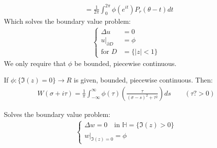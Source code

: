 \begin{proposition}
\begin{align}
                        & = \frac{1}{2\pi}\int_{0}^{2\pi}\phi(e^{it})P_r(\theta - t)dt
    \end{align}
    Which solves the boundary value problem:
    \begin{align}
        \begin{cases}
            \Delta u        & = 0           \\
            u|_{\partial D} & = \phi        \\
            \text{for }D    & = \{|z| < 1\}
        \end{cases}
    \end{align}
    We only require that $\phi$ be bounded, piecewise continuous.
\end{proposition}

\begin{theorem}
    If $\phi: \{\Im (z)  = 0 \} \to R$ is given, bounded, piecewise continuous. Then:
    \begin{align}
        \boxed{W(\sigma + i\tau) = \frac{1}{\pi}\int_{-\infty}^{\infty}\phi(\tau)\left( \frac{\tau}{(\sigma - s)^2 + \tau^2} \right)ds \qquad (\tau ?> 0)}
    \end{align}

    Solves the boundary value problem:
    \begin{align}
        \begin{cases}
            \Delta w = 0 \quad \text{in } \mathbb{H} = \{\Im (z) > 0\} \\
            w|_{\Im (z) = 0} = \phi
        \end{cases}
    \end{align}
\end{theorem}

